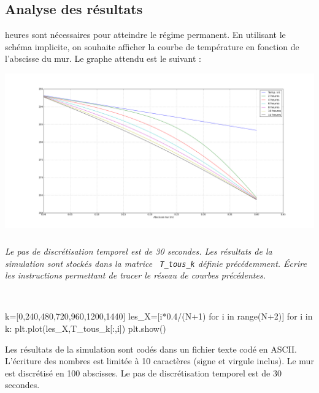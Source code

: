 \documentclass[10pt,fleqn]{article} %
\begin{document}
\begin{multicols}{2}
\begin{multicols}{2}
%
\ifprof
\else
\newpage
\fi

\section{Analyse des résultats}
\ifprof
{} heures sont nécessaires pour atteindre le régime permanent. En utilisant le schéma implicite, on souhaite afficher la courbe de température en fonction de l'abscisse du mur. Le graphe attendu est le suivant :

\begin{center}
\includegraphics[width=\linewidth]{images/figure_04}
\end{center}

\fi

\subparagraph{}
\textit{Le pas de discrétisation temporel est de 30 secondes. Les résultats de la simulation sont stockés dans la matrice  \texttt{ T\_tous\_k}  définie précédemment. Écrire les instructions permettant de tracer le réseau de courbes précédentes.}
\ifprof

\begin{corrige}
~\\
\begin{python}
k=[0,240,480,720,960,1200,1440]
les_X=[i*0.4/(N+1) for i in range(N+2)]
for i in k:
    plt.plot(les_X,T_tous_k[:,i])
plt.show()
\end{python}
\end{corrige}
\else
\fi

\ifprof
\else
\vspace{.5cm}

Les résultats de la simulation sont codés dans un fichier texte codé en ASCII. L'écriture des nombres est limitée à 10 caractères (signe et virgule inclus). 
Le mur est discrétisé en 100 abscisses. Le pas de discrétisation temporel est de 30 secondes. 
\fi


\end{multicols}
\end{multicols}
\end{document}
